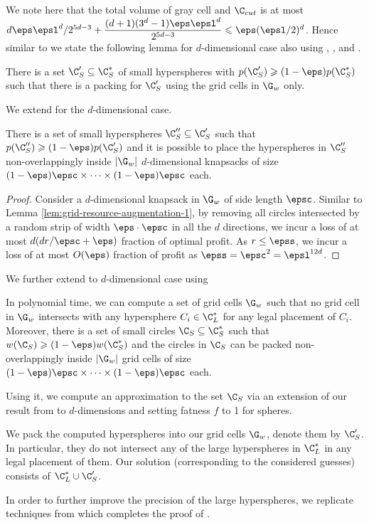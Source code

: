 	We note here that the total volume of gray cell and \(\C_{cut}\) is at most \(d\eps\epsl^d/2^{5d-3}+\dfrac{(d+1)(3^d-1)\eps\epsl^d}{2^{5d-3}} \leqslant \eps (\epsl/2)^d\). Hence similar to  we state the following lemma for $d$-dimensional case also using , , and .
	\begin{lem}
		\label{lem:small-circles-white-grid-cells-d}
		There
		is a set $\C'_S \subseteq \C^*_S$ of small hyperspheres with
		$p(\C'_S)\geqslant (1-\eps) p(\C^*_S)$
		such that there is a packing for $\C'_S$ using the grid cells in $\G_w$ only.
	\end{lem}
	We extend  for the $d$-dimensional case.
	\begin{lem} \label{lem:grid-resource-augmentation-d}
		There is a set of small hyperspheres $\C''_{S}\subseteq\C'_{S}$ such that $p(\C''_{S})\geqslant(1-\eps)p(\C'_{S})$
		and it is possible to place the hyperspheres in $\C''_{S}$ non-overlappingly
		inside $|\G_{w}|$ $d$-dimensional knapsacks of size $(1-\eps)\epsc \times\cdots \times(1-\eps)\epsc$
		each. \end{lem}
	\begin{proof}
			Consider a $d$-dimensional knapsack in $\G_{w}$ of side length $\epsc$.
		Similar to Lemma \ref{lem:grid-resource-augmentation-1}, by removing all circles intersected by a random strip of width $\eps \cdot \epsc$ in all the $d$ directions, we incur a loss of at most $d(d r/\epsc + \eps)$ fraction of optimal profit. As $r\le \epss$, we incur a loss of at most $O(\eps)$ fraction of profit as $\epss = \epsc^2 = \epsl^{12d}$.
	\end{proof}
	We further extend  to $d$-dimensional case using 
	\begin{lemma}\label{lem:structured-packing-d}
		In polynomial time, we can compute a set of grid cells $\G_w$ such that no grid cell in $\G_w$ intersects with any
		hypersphere $C_i \in\C_{L}^{*}$ for any legal placement of $C_i$. Moreover, there is a set of small circles $\C_S \subseteq \C_{S}^{*}$ such that $w(\C_{S}) \geqslant (1-\eps)w(\C_{S}^{*})$ and
		the circles in $\C_S$ can be packed non-overlappingly inside $|\G_w|$ grid cells of size $(1-\eps) \epsc \times\dots\times(1-\eps) \epsc$ each.
	\end{lemma}
		Using it, we compute an approximation to the set $\C_S$ via an extension of our result from  to $d$-dimensions and setting fatness $f$ to 1 for spheres.
	
	
	We pack the computed hyperspheres into our grid cells $\G_w$, denote them by $\C'_S$. In particular, they do not intersect any of the
	large hyperspheres in $\C_{L}^{*}$ in any legal placement of them. Our solution (corresponding to the considered guesses) consists of $\C_{L}^{*}\cup \C'_S$.

In order to further improve the precision of the large hyperspheres, we replicate techniques from  which completes the proof of .
